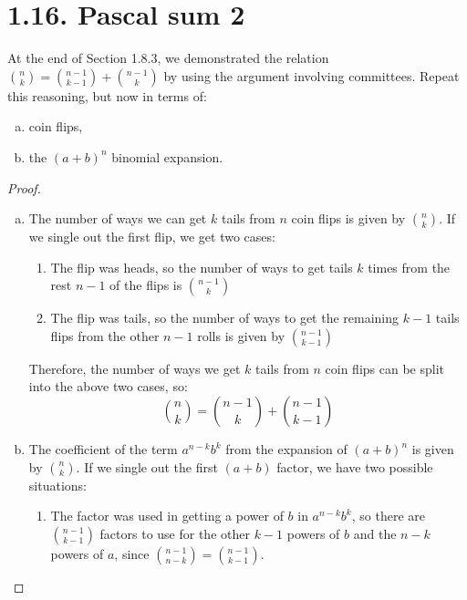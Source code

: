 \section*{1.16. Pascal sum 2}
At the end of Section 1.8.3, we demonstrated the relation 
$\binom{n}{k} = \binom{n - 1}{k - 1} + \binom{n - 1}{k}$
by using the argument involving committees. Repeat this reasoning,
but now in terms of:
\begin{enumerate}[(a)]
    \item coin flips,
    \item the $(a + b)^n$ binomial expansion.
\end{enumerate}

\vspace{1em}

\begin{proof}
    \hfill
    \begin{enumerate}[(a)]
        \item The number of ways we can get $k$ tails from $n$ coin flips is given by 
            $\binom{n}{k}$. If we single out the first flip, we get two cases:
            \begin{enumerate}[(1)]
                \item The flip was heads, so the number of ways to get tails $k$ times
                    from the rest $n - 1$ of the flips is $\binom{n - 1}{k}$

                \item The flip was tails, so the number of ways to get the remaining 
                    $k - 1$ tails flips from the other $n - 1$ rolls is given by $\binom{n - 1}{k - 1}$
            \end{enumerate}

        Therefore, the number of ways we get $k$ tails from $n$ coin flips can be split into the above
        two cases, so:
        \[
            \binom{n}{k} = \binom{n - 1}{k} + \binom{n - 1}{k - 1}
        \] 

    \item The coefficient of the term $a^{n - k}b^k$ from the expansion of $(a + b)^n$ is given by 
        $\binom{n}{k}$. If we single out the first $(a + b)$ factor, we have two possible situations:
        \begin{enumerate}
            \item The factor was used in getting a power of $b$ in $a^{n - k}b^k$, so there are 
                $\binom{n - 1}{k - 1}$ factors to use for the other $k - 1$ powers of $b$ and the $n - k$ 
                powers of $a$, since 
                $\binom{n - 1}{n - k} = \binom{n - 1}{k - 1}$.


\end{enumerate}
\end{enumerate}
\end{proof}
